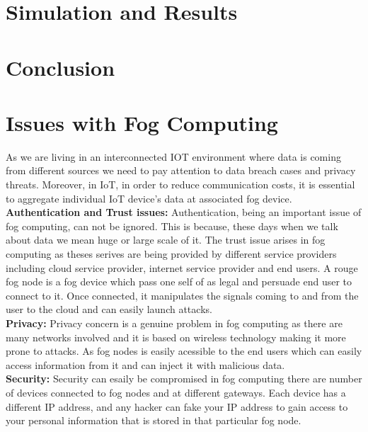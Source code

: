 \documentclass[10pt]{llncs}
\begin{document}


%
\section{Simulation and Results}


%
\section{Conclusion}


%
\section{Issues with Fog Computing}
As we are living in an interconnected IOT environment where data is coming from different  sources we need to pay attention to data breach cases and privacy threats. Moreover, in IoT, in order to reduce communication costs, it is essential to aggregate individual IoT device’s data at associated fog device.\\
\textbf{Authentication and Trust issues:} Authentication, being an important issue of fog computing, can not be ignored. This is because, these days when we talk about data we mean huge or large scale of it. The trust issue arises in fog computing as theses serives are being provided by different service providers including cloud service provider, internet service provider and end users. A rouge fog node is a fog device which pass one self of as legal and persuade end user to connect to it. Once connected, it manipulates the signals coming to and from the user to the cloud and can easily launch attacks.\\
\textbf{Privacy:} Privacy concern is a genuine problem in fog computing as there are many networks involved and it is based on wireless technology making it more prone to attacks. As fog nodes is easily acessible to the end users which can easily access information from it and can inject it with malicious data.\\
\textbf{Security:} Security can esaily be compromised in fog computing there are number of devices connected to fog nodes and at different gateways. Each device has a different IP address, and any hacker can fake your IP address to gain access to your personal information that is stored in that particular fog node.\\
\end{document}
